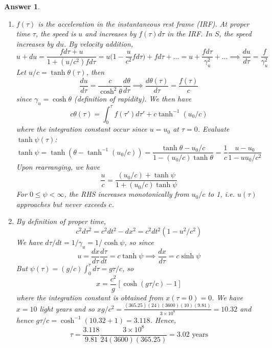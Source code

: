 \documentclass[a4paper]{article}
\newtheorem{ans}{Answer}[subsection]
\theoremstyle{new}
\begin{document}
\begin{ans}\leavevmode
\begin{enumerate}[label=(\alph*)]
\item $f(\tau)$ is the acceleration in the instantaneous rest frame (IRF). At proper time $\tau$, the speed is $u$ and increases by $f(\tau)d\tau$ in the IRF. In $S$, the speed increases by $du$. By velocity addition,
$$u+du=\frac{fd\tau+u}{1+(u/c^2)fd\tau}=u\bigg(1-\frac{u}{c^2}fd\tau\bigg)+fd\tau+\dots=u+\frac{fd\tau}{\gamma_u^2}+\dots\implies\frac{du}{d\tau}=\frac{f}{\gamma_u^2}$$
Let $u/c=\tanh\theta(\tau)$, then
$$\frac{du}{d\tau}=\frac{c}{\cosh^2\theta}\frac{d\theta}{d\tau}\implies\frac{d\theta(\tau)}{d\tau}=\frac{f(\tau)}{c}$$
since $\gamma_u=\cosh\theta$ (definition of rapidity). We then have
$$c\theta(\tau)=\int_0^\tau f(\tau')d\tau'+c\tanh^{-1}(u_0/c)$$
where the integration constant occur since $u=u_0$ at $\tau=0$. Evaluate $\tanh\psi(\tau)$:
$$\tanh\psi=\tanh(\theta-\tanh^{-1}(u_0/c))=\frac{\tanh\theta-u_0/c}{1-(u_0/c)\tanh\theta}=\frac{1}{c}\frac{u-u_0}{1-uu_0/c^2}$$
Upon rearranging, we have
$$\frac{u}{c}=\frac{(u_0/c)+\tanh\psi}{1+(u_0/c)\tanh\psi}$$
For $0\leq\psi<\infty$, the RHS increases monotonically from $u_0/c$ to 1, i.e. $u(\tau)$ approaches but never exceeds $c$.
\item By definition of proper time,
$$c^2d\tau^2=c^2dt^2-dx^2=c^2dt^2(1-u^2/c^2)$$
We have $d\tau/dt=1/\gamma_u=1/\cosh\psi$, so since
$$u=\frac{dx}{d\tau}\frac{d\tau}{dt}=c\tanh\psi\implies\frac{dx}{d\tau}=c\sinh\psi$$
But $\psi(\tau)=(g/c)\int_0^\tau d\tau=g\tau/c$, so
$$x=\frac{c^2}{g}[\cosh(g\tau/c)-1]$$
where the integration constant is obtained from $x(\tau=0)=0$. We have $x=10$ light years and so $xg/c^2=\frac{(365.25)(24)(3600)(10)(9.81)}{3\times10^8}=10.32$ and hence $g\tau/c=\cosh^{-1}(10.32+1)=3.118$. Hence,
$$\tau=\frac{3.118}{9.81}\frac{3\times10^8}{24(3600)(365.25)}=3.02\text{ years}$$
\end{enumerate}
\end{ans}
\newpage
\end{document}
